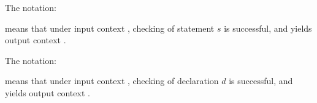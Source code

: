 
The notation:
\begin{center}
\end{center}
means that under input context \ContextVarA, checking of statement $s$ is successful, and yields output context \ContextVarB.


The notation:
\begin{center}
\end{center}
means that under input context \ContextVarA, checking of declaration $d$ is successful, and yields output context \ContextVarB.

